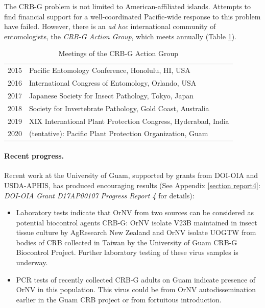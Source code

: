 \documentclass[12pt,letterpaper,english,bibliography=totocnumbered, abstract=on]{scrartcl}
\begin{document}
The CRB-G problem is not limited to American-affiliated islands. Attempts to find financial support for a well-coordinated Pacific-wide response to this problem have failed. However, there is an \textit{ad hoc} international community of entomologists, the \textit{CRB-G Action Group}, which meets annually (Table \ref{table meetings}).

\begin{table}[H]
	\label{table meetings}
	\centering
	\caption{Meetings of the CRB-G Action Group}
	\begin{tabular}{ll}
		\hline 
		2015 & Pacific Entomology Conference, Honolulu, HI, USA \\ 
		2016 & International Congress of Entomology, Orlando, USA \\
		2017 & Japanese Society for Insect Pathology, Tokyo, Japan \\
		2018 & Society for Invertebrate Pathology, Gold Coast, Australia \\
		2019 & XIX International Plant Protection Congress, Hyderabad, India \\
		2020 & (tentative): Pacific Plant Protection Organization, Guam \\ 
		\hline
\end{tabular}
\end{table}






\paragraph{Recent progress.}
\label{recent progress}

Recent work at the University of Guam, supported by grants from DOI-OIA and USDA-APHIS, has produced encouraging results (See Appendix \ref{section report4}: \textit{DOI-OIA Grant D17AP00107 Progress Report 4} for details):

\begin{itemize}
	
\item	Laboratory tests indicate that OrNV from two sources can be considered as potential biocontrol agents CRB-G: OrNV isolate V23B maintained in insect tissue culture by AgResearch New Zealand and OrNV isolate UOGTW from bodies of CRB collected in Taiwan by the University of Guam CRB-G Biocontrol Project. Further laboratory testing of these virus samples is underway. 
	
\item	PCR tests of recently collected CRB-G adults on Guam indicate presence of OrNV in this population. This virus could be from OrNV autodissemination earlier in the Guam CRB project or from fortuitous introduction.

\end{itemize}
	
\end{document}
